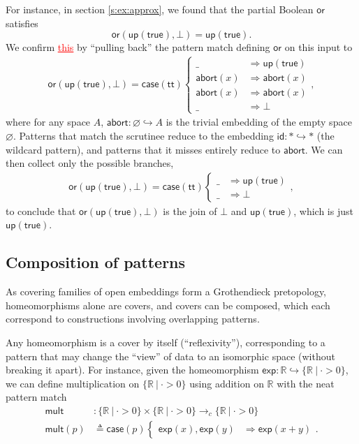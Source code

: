 \documentclass[conference]{IEEEtran}
\newcommand{\hookto}{\hookrightarrow}
\newcommand{\cto}{\to_c}
\newcommand{\R}{\mathbb{R}}
\newcommand{\suchthat}{\ |\ }
\newcommand{\Zero}{\varnothing}
\newcommand{\One}{\ast}
\newcommand{\wildcard}{\_}
\newcommand{\Branch}{\Rightarrow}
\newcommand{\up}{\mathsf{up}}
\newcommand{\btrue}{\mathsf{true}}
\newcommand{\grammar}[1]{\textcolor{red}{\underline{#1}}}
\begin{document}
For instance, in section \ref{s:ex:approx}, we found that the partial Boolean $\mathsf{or}$ satisfies
\[
\mathsf{or}(\mathsf{up}(\mathsf{true}), \bot) = \mathsf{up}(\mathsf{true}).
\]
We confirm \grammar{this} by ``pulling back'' the pattern match defining $\mathsf{or}$ on this input to
\begin{align*}
\mathsf{or}(\mathsf{up}(\mathsf{true}), \bot) = \mathsf{case}(\mathsf{tt})
\begin{cases}
\wildcard &\Branch \up(\btrue)
\\ \mathsf{abort}(x) &\Branch \mathsf{abort}(x)
\\ \mathsf{abort}(x) &\Branch \mathsf{abort}(x)
\\ \wildcard &\Branch \bot
\end{cases},
\end{align*}
where for any space $A$, $\mathsf{abort} : \Zero \hookto A$ is the trivial embedding of the empty space $\Zero$. Patterns that match the scrutinee reduce to the embedding $\mathsf{id} : \One \hookto \One$ (the wildcard pattern), and patterns that it misses entirely reduce to $\mathsf{abort}$. We can then collect only the possible branches,
\begin{align*}
\mathsf{or}(\mathsf{up}(\mathsf{true}), \bot) = \mathsf{case}(\mathsf{tt})
\begin{cases}
\wildcard &\Branch \up(\btrue)
\\ \wildcard &\Branch \bot
\end{cases},
\end{align*}
to conclude that $\mathsf{or}(\mathsf{up}(\mathsf{true}), \bot)$ is the join of $\bot$ and $\mathsf{up}(\mathsf{true})$, which is just $\mathsf{up}(\mathsf{true})$.

\subsection{Composition of patterns}

As covering families of open embeddings form a Grothendieck pretopology, homeomorphisms alone are covers, and covers can be composed, which each correspond to constructions involving overlapping patterns.

Any homeomorphism is a cover by itself (``reflexivity''), corresponding to a pattern that may change the ``view'' of data to an isomorphic space (without breaking it apart). For instance, given the homeomorphism $\mathsf{exp} : \R \hookto \{ \R \suchthat \cdot > 0 \}$, we can define multiplication on $\{\R \suchthat \cdot > 0 \}$ using addition on $\R$ with the neat pattern match
\begin{align*}
\mathsf{mult} &: \{\R \suchthat \cdot > 0 \} \times \{\R \suchthat \cdot > 0 \} \cto \{\R \suchthat \cdot > 0 \}
\\ \mathsf{mult}(p) &\triangleq \mathsf{case}(p)
\begin{cases}
\mathsf{exp}(x), \mathsf{exp}(y) &\Branch \mathsf{exp}(x + y)
\end{cases}.
\end{align*}
\end{document}
